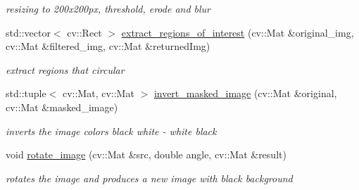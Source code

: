 \begin{DoxyCompactItemize}
\begin{DoxyCompactList}\small\item\em resizing to 200x200px, threshold, erode and blur \end{DoxyCompactList}\item 
\mbox{\label{class_image_processing_1_1_character___recognition___algorithm_a7552eb21dca6acfa702518ae36e3de8b}} 
std\+::vector$<$ cv\+::\+Rect $>$ \mbox{\hyperlink{class_image_processing_1_1_character___recognition___algorithm_a7552eb21dca6acfa702518ae36e3de8b}{extract\+\_\+regions\+\_\+of\+\_\+interest}} (cv\+::\+Mat \&original\+\_\+img, cv\+::\+Mat \&filtered\+\_\+img, cv\+::\+Mat \&returned\+Img)
\begin{DoxyCompactList}\small\item\em extract regions that circular \end{DoxyCompactList}\item 
\mbox{\label{class_image_processing_1_1_character___recognition___algorithm_af4e813e7e622253bd1fa1f3253f80816}} 
std\+::tuple$<$ cv\+::\+Mat, cv\+::\+Mat $>$ \mbox{\hyperlink{class_image_processing_1_1_character___recognition___algorithm_af4e813e7e622253bd1fa1f3253f80816}{invert\+\_\+masked\+\_\+image}} (cv\+::\+Mat \&original, cv\+::\+Mat \&masked\+\_\+image)
\begin{DoxyCompactList}\small\item\em inverts the image colors black white -\/ white black \end{DoxyCompactList}\item 
\mbox{\label{class_image_processing_1_1_character___recognition___algorithm_a08d3f01496729b439e68819e61a564e5}} 
void \mbox{\hyperlink{class_image_processing_1_1_character___recognition___algorithm_a08d3f01496729b439e68819e61a564e5}{rotate\+\_\+image}} (cv\+::\+Mat \&src, double angle, cv\+::\+Mat \&result)
\begin{DoxyCompactList}\small\item\em rotates the image and produces a new image with black background \end{DoxyCompactList}\item 
\mbox{\label{class_image_processing_1_1_character___recognition___algorithm_a649e7aeabaa4bc0350ad13a053e4e720}} 

\end{DoxyCompactItemize}
